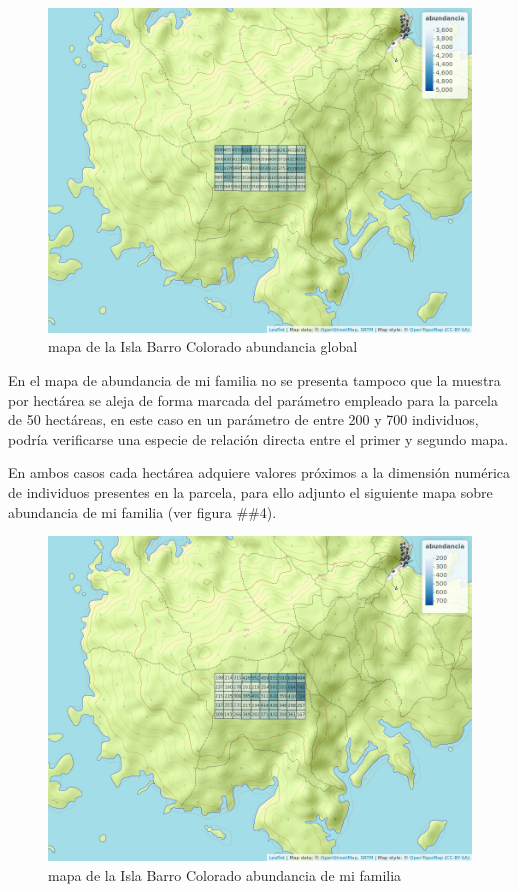 \documentclass[11pt,]{article}
\begin{document}
\begin{figure}
\centering
\includegraphics[width=1.00000\textwidth]{mapa_cuadros_abun_global.png}
\caption{mapa de la Isla Barro Colorado abundancia global
\label{fig:bci_map}}
\end{figure}

En el mapa de abundancia de mi familia no se presenta tampoco que la
muestra por hectárea se aleja de forma marcada del parámetro empleado
para la parcela de 50 hectáreas, en este caso en un parámetro de entre
200 y 700 individuos, podría verificarse una especie de relación directa
entre el primer y segundo mapa.

En ambos casos cada hectárea adquiere valores próximos a la dimensión
numérica de individuos presentes en la parcela, para ello adjunto el
siguiente mapa sobre abundancia de mi familia (ver figura \#\#4).

\begin{figure}
\centering
\includegraphics[width=1.00000\textwidth]{mapa_cuadros_abun_mi_familia.png}
\caption{mapa de la Isla Barro Colorado abundancia de mi familia
\label{fig:bci_map}}
\end{figure}
\end{document}
